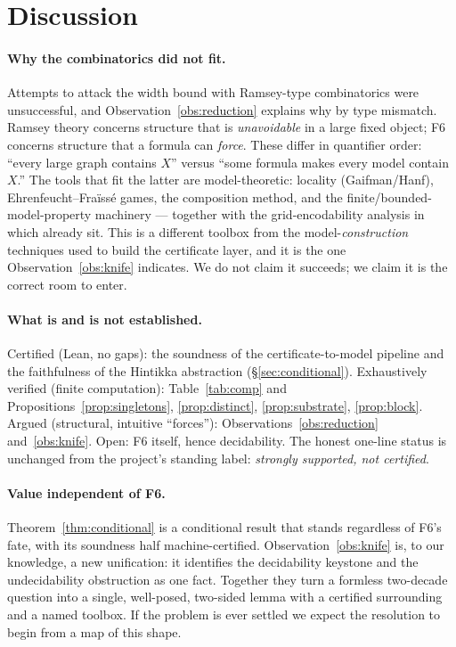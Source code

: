 \documentclass[11pt]{article}
\theoremstyle{plain}
\theoremstyle{definition}
\begin{document}
\section{Discussion}\label{sec:discussion}

\paragraph{Why the combinatorics did not fit.}
Attempts to attack the width bound with Ramsey-type combinatorics were
unsuccessful, and Observation~\ref{obs:reduction} explains why by type
mismatch. Ramsey theory concerns structure that is \emph{unavoidable}
in a large fixed object; F6 concerns structure that a formula can
\emph{force}. These differ in quantifier order: ``every large graph
contains $X$'' versus ``some formula makes every model contain $X$.''
The tools that fit the latter are model-theoretic: locality
(Gaifman/Hanf), Ehrenfeucht--Fra\"iss\'e games, the composition method,
and the finite/bounded-model-property machinery --- together with the
grid-encodability analysis in which
\cite{wessel2003,lutzwolter2006} already sit. This is a different
toolbox from the model-\emph{construction} techniques used to build the
certificate layer, and it is the one Observation~\ref{obs:knife}
indicates. We do not claim it succeeds; we claim it is the correct room
to enter.

\paragraph{What is and is not established.}
Certified (Lean, no gaps): the soundness of the certificate-to-model
pipeline and the faithfulness of the Hintikka abstraction
(\S\ref{sec:conditional}). Exhaustively verified (finite computation):
Table~\ref{tab:comp} and Propositions~\ref{prop:singletons},
\ref{prop:distinct}, \ref{prop:substrate}, \ref{prop:block}. Argued
(structural, intuitive ``forces''): Observations~\ref{obs:reduction}
and~\ref{obs:knife}. Open: F6 itself, hence decidability. The honest
one-line status is unchanged from the project's standing label:
\emph{strongly supported, not certified}.

\paragraph{Value independent of F6.}
Theorem~\ref{thm:conditional} is a conditional result that stands
regardless of F6's fate, with its soundness half machine-certified.
Observation~\ref{obs:knife} is, to our knowledge, a new unification: it
identifies the decidability keystone and the undecidability obstruction
as one fact. Together they turn a formless two-decade question into a
single, well-posed, two-sided lemma with a certified surrounding and a
named toolbox. If the problem is ever settled we expect the resolution
to begin from a map of this shape.
\end{document}
